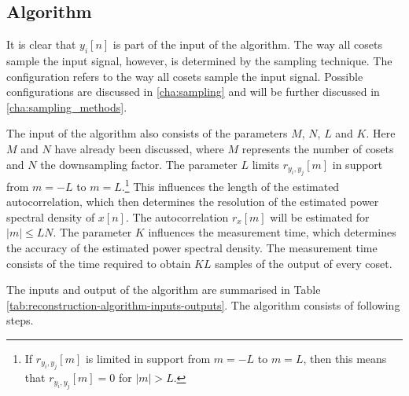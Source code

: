 \documentclass[a4paper, openany, oneside]{memoir}
\begin{document}
\subsection{Algorithm}
It is clear that $y_i[n]$ is part of the input of the algorithm. The way all cosets sample the input signal, however, is determined by the sampling technique. The configuration refers to the way all cosets sample the input signal. Possible configurations are discussed in \cref{cha:sampling} and will be further discussed in \cref{cha:sampling_methods}.

The input of the algorithm also consists of the parameters $M$, $N$, $L$ and $K$. Here $M$ and $N$ have already been discussed, where $M$ represents the number of cosets and $N$ the downsampling factor. The parameter $L$ limits $r_{y_i,y_j}[m]$ in support from $m=-L$ to $m=L$.\footnote{If $r_{y_i,y_j}[m]$ is limited in support from $m=-L$ to $m=L$, then this means that $r_{y_i,y_j}[m]=0$ for $|m|>L$.} This influences the length of the estimated autocorrelation, which then determines the resolution of the estimated power spectral density of $x[n]$. The autocorrelation $r_x[m]$ will be estimated for $|m| \le LN$. The parameter $K$ influences the measurement time, which determines the accuracy of the estimated power spectral density. The measurement time consists of the time required to obtain $KL$ samples of the output of every coset.

The inputs and output of the algorithm are summarised in Table \ref{tab:reconstruction-algorithm-inputs-outputs}. The algorithm consists of following steps.
\end{document}

